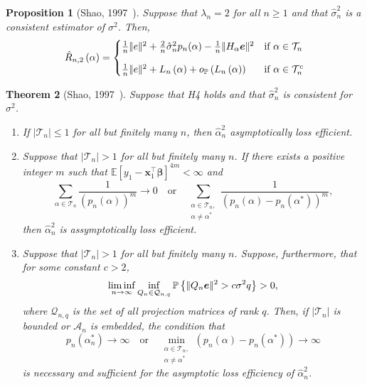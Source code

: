 \documentclass[12pt, letter paper]{article}
\newcommand{\1}{\mathmybb{1}}
\newtheorem{proposition}{Proposition}[section]
\newtheorem{theorem}[proposition]{Theorem}
\newcommand{\0}{\emptyset}
\newcommand{\prob}{\mathbb{P}}
\newcommand{\Ep}[1]{\mathbb{E}\left[ #1 \right]}
\newcommand{\paren}[1]{\left(#1 \right)}
\newcommand{\set}[1]{\left\{ #1 \right\}}
\newcommand{\norm}[1]{|\hspace{-1pt}|#1 |\hspace{-1pt}|}
\newcommand{\normsq}[1]{\norm{#1}^{2}}
\newcommand{\Acal}{\mathcal{A}_{n}}
\newcommand{\Tcal}{\mathcal{T}_{n}}
\newcommand{\x}{\boldsymbol{x}}
\newcommand{\e}{\boldsymbol{e}}
\newcommand{\bbeta}{\boldsymbol{\beta}}
\newcommand{\Loss}[1]{L_{n}\paren{#1}}
\newcommand{\Rhat}[2]{\hat{R}_{n, #1}\paren{#2}}
\newcommand{\alphahat}[1]{\hat{\alpha}^{#1}}
\newcommand{\op}[1]{o_{\prob}\paren{#1}}
\newcommand{\sigmahat}{\hat{\sigma}^{2}_{n}}
\begin{document}
\begin{proposition}[Shao, 1997~\cite{shao_1997}]\label{prop:97prop1}
    Suppose that \(\lambda_{n}=2\) for all \(n\geq 1\) and that \(\sigmahat\) is a consistent estimator of \(\sigma^{2}\). Then,
    \[\Rhat{2}{\alpha} = \begin{cases}
        \frac{1}{n}\normsq{e} + \frac{2}{n}\sigmahat p_{n}(\alpha) - \frac{1}{n}\normsq{H_{\alpha}\e} &\text{if }\alpha\in\Tcal\\[3mm]
        \frac{1}{n}\normsq{e} + \Loss{\alpha} + \op{\Loss{\alpha}} &\text{if }\alpha\in\Tcal^{c}
    \end{cases}\]
\end{proposition}

\begin{theorem}[Shao, 1997~\cite{shao_1997}]\label{thm:97thm1}
    Suppose that H4 holds and that \(\sigmahat\) is consistent for \(\sigma^{2}\).
    \begin{enumerate}
        \item If \(|\Tcal|\leq1\) for all but finitely many \(n\), then \(\alphahat{2}_{n}\) asymptotically loss efficient.
        \item Suppose that \(|\Tcal|> 1\) for all but finitely many \(n\). If there exists a positive integer \(m\) such that \(\Ep{y_{1} - \x_{1}^{\top}\bbeta}^{4m}<\infty\) and 
        \begin{equation}
            \sum_{\alpha\in\Tcal}\frac{1}{\paren{p_{n}(\alpha)}^{m}}\to 0 \quad\text{or}\quad \sum_{\substack{\alpha\in\Tcal,\\ \alpha\neq\alpha^{*}}}\frac{1}{\paren{p_{n}(\alpha) - p_{n}(\alpha^{*})}^{m}},
        \end{equation}
        then \(\alphahat{2}_{n}\) is assymptotically loss efficient.
        \item Suppose that \(|\Tcal|>1\) for all but finitely many \(n\). Suppose, furthermore, that for some constant \(c>2\), 
        \begin{equation}
            \label{eq:conditionQ}
            \liminf_{n\to\infty}\inf_{Q_{n}\in\mathcal{Q}_{n,q}}\prob\set{\normsq{Q_{n}\e} > c\sigma^{2}q} > 0,
        \end{equation}
        where \(\mathcal{Q}_{n,q}\) is the set of all projection matrices of rank \(q\). Then, if \(|\Tcal|\) is bounded or \(\Acal\) is embedded, the condition that
        \begin{equation}
            \label{eq:conditionP}
            p_{n}(\alpha^{*}_{n})\to\infty\quad\text{or}\quad \min_{\substack{\alpha\in\Tcal,\\ \alpha\neq\alpha^{*}}}\paren{p_{n}(\alpha) - p_{n}(\alpha^{*})}\to\infty
        \end{equation}
        is necessary and sufficient for the asymptotic loss efficiency of \(\alphahat{2}_{n}\).
    \end{enumerate}
\end{theorem}
\end{document}
